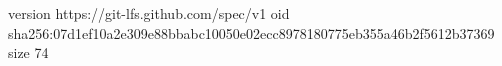 version https://git-lfs.github.com/spec/v1
oid sha256:07d1ef10a2e309e88bbabc10050e02ecc8978180775eb355a46b2f5612b37369
size 74

